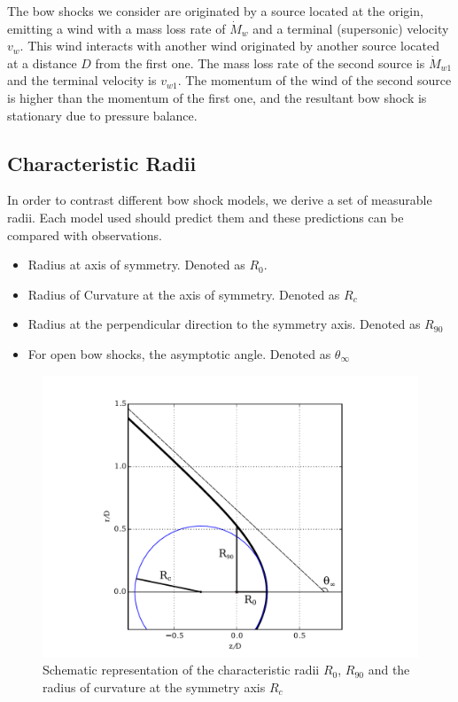 The bow shocks we consider are originated by a source located at the origin, emitting a wind with a mass loss rate of $\dot{M}_w$ and a terminal
(supersonic) velocity $v_w$. This wind interacts with another wind originated by another source located at a distance $D$ from the first one. 
The mass loss rate of the second source is $\dot{M}_{w1}$ and the terminal velocity is $v_{w1}$. The momentum of the wind of the second source is
higher than the momentum of the first one, and the resultant bow shock is stationary due to pressure balance. 

\subsection{Characteristic Radii}

In order to contrast different bow shock models, we  derive a set of measurable radii. Each model used should predict them and these predictions can be
compared with observations.

\begin{itemize}
\item Radius at axis of symmetry. Denoted as $R_0$. 
\item Radius of Curvature at the axis of symmetry. Denoted as $R_c$
\item Radius at the  perpendicular direction to the symmetry axis. Denoted as $R_{90}$
\item For open bow shocks, the asymptotic angle. Denoted as $\theta_\infty$
\end{itemize} 

\begin{figure}
\includegraphics[width=\linewidth]{ch-radii_ed2}
\caption{Schematic representation of the characteristic radii $R_0$, $R_{90}$ and the radius of curvature at the symmetry axis $R_c$}
\end{figure}



